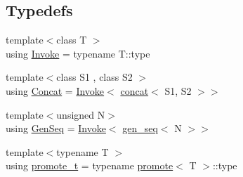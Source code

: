 \subsection*{Typedefs}
\begin{DoxyCompactItemize}
\item 
{\footnotesize template$<$class T $>$ }\\using \hyperlink{namespacecrow_1_1black__magic_a6b8ed264432b676b8f13faf399c7343f}{Invoke} = typename T\-::type
\item 
{\footnotesize template$<$class S1 , class S2 $>$ }\\using \hyperlink{namespacecrow_1_1black__magic_aa5da930ee46c60876b74714b9cbd9822}{Concat} = \hyperlink{namespacecrow_1_1black__magic_a6b8ed264432b676b8f13faf399c7343f}{Invoke}$<$ \hyperlink{structcrow_1_1black__magic_1_1concat}{concat}$<$ S1, S2 $>$$>$
\item 
{\footnotesize template$<$unsigned N$>$ }\\using \hyperlink{namespacecrow_1_1black__magic_a697b4738762ac4a1e0d56df7dc0aa5a9}{Gen\-Seq} = \hyperlink{namespacecrow_1_1black__magic_a6b8ed264432b676b8f13faf399c7343f}{Invoke}$<$ \hyperlink{structcrow_1_1black__magic_1_1gen__seq}{gen\-\_\-seq}$<$ N $>$$>$
\item 
{\footnotesize template$<$typename T $>$ }\\using \hyperlink{namespacecrow_1_1black__magic_a4964540ce915507f5167e1a96f801c71}{promote\-\_\-t} = typename \hyperlink{structcrow_1_1black__magic_1_1promote}{promote}$<$ T $>$\-::type
\end{DoxyCompactItemize}

